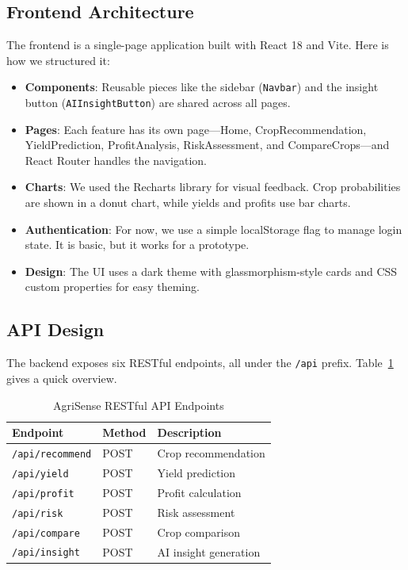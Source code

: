 \documentclass[conference]{IEEEtran}
\begin{document}
\subsection{Frontend Architecture}
The frontend is a single-page application built with React 18 and Vite. Here is how we structured it:

\begin{itemize}
    \item \textbf{Components}: Reusable pieces like the sidebar (\texttt{Navbar}) and the insight button (\texttt{AIInsightButton}) are shared across all pages.
    \item \textbf{Pages}: Each feature has its own page---Home, CropRecommendation, YieldPrediction, ProfitAnalysis, RiskAssessment, and CompareCrops---and React Router handles the navigation.
    \item \textbf{Charts}: We used the Recharts library for visual feedback. Crop probabilities are shown in a donut chart, while yields and profits use bar charts.
    \item \textbf{Authentication}: For now, we use a simple localStorage flag to manage login state. It is basic, but it works for a prototype.
    \item \textbf{Design}: The UI uses a dark theme with glassmorphism-style cards and CSS custom properties for easy theming.
\end{itemize}

\subsection{API Design}
The backend exposes six RESTful endpoints, all under the \texttt{/api} prefix. Table~\ref{tab:api_endpoints} gives a quick overview.

\begin{table}[htbp]
\caption{AgriSense RESTful API Endpoints}
\label{tab:api_endpoints}
\centering
\begin{tabular}{@{}lll@{}}
\toprule
\textbf{Endpoint} & \textbf{Method} & \textbf{Description} \\
\midrule
\texttt{/api/recommend} & POST & Crop recommendation \\
\texttt{/api/yield} & POST & Yield prediction \\
\texttt{/api/profit} & POST & Profit calculation \\
\texttt{/api/risk} & POST & Risk assessment \\
\texttt{/api/compare} & POST & Crop comparison \\
\texttt{/api/insight} & POST & AI insight generation \\
\bottomrule
\end{tabular}
\end{table}
\end{document}
